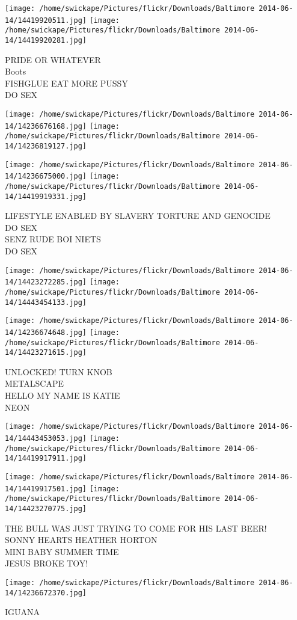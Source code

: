 \documentclass[10pt,letterpaper]{article}
\begin{document}
\texttt{[image: /home/swickape/Pictures/flickr/Downloads/Baltimore 2014-06-14/14419920511.jpg]}
\texttt{[image: /home/swickape/Pictures/flickr/Downloads/Baltimore 2014-06-14/14419920281.jpg]}

PRIDE OR WHATEVER\\
Boots\\
FISHGLUE EAT MORE PUSSY\\
DO SEX
\pagebreak

\texttt{[image: /home/swickape/Pictures/flickr/Downloads/Baltimore 2014-06-14/14236676168.jpg]}
\texttt{[image: /home/swickape/Pictures/flickr/Downloads/Baltimore 2014-06-14/14236819127.jpg]}

\texttt{[image: /home/swickape/Pictures/flickr/Downloads/Baltimore 2014-06-14/14236675000.jpg]}
\texttt{[image: /home/swickape/Pictures/flickr/Downloads/Baltimore 2014-06-14/14419919331.jpg]}

LIFESTYLE ENABLED BY SLAVERY TORTURE AND GENOCIDE\\
DO SEX\\
SENZ RUDE BOI NIETS\\
DO SEX
\pagebreak

\texttt{[image: /home/swickape/Pictures/flickr/Downloads/Baltimore 2014-06-14/14423272285.jpg]}
\texttt{[image: /home/swickape/Pictures/flickr/Downloads/Baltimore 2014-06-14/14443454133.jpg]}

\texttt{[image: /home/swickape/Pictures/flickr/Downloads/Baltimore 2014-06-14/14236674648.jpg]}
\texttt{[image: /home/swickape/Pictures/flickr/Downloads/Baltimore 2014-06-14/14423271615.jpg]}

UNLOCKED!  TURN KNOB\\
METALSCAPE\\
HELLO MY NAME IS KATIE\\
NEON
\pagebreak

\texttt{[image: /home/swickape/Pictures/flickr/Downloads/Baltimore 2014-06-14/14443453053.jpg]}
\texttt{[image: /home/swickape/Pictures/flickr/Downloads/Baltimore 2014-06-14/14419917911.jpg]}

\texttt{[image: /home/swickape/Pictures/flickr/Downloads/Baltimore 2014-06-14/14419917501.jpg]}
\texttt{[image: /home/swickape/Pictures/flickr/Downloads/Baltimore 2014-06-14/14423270775.jpg]}

THE BULL WAS JUST TRYING TO COME FOR HIS LAST BEER!\\
SONNY HEARTS HEATHER HORTON\\
MINI BABY SUMMER TIME\\
JESUS BROKE TOY!
\pagebreak

\texttt{[image: /home/swickape/Pictures/flickr/Downloads/Baltimore 2014-06-14/14236672370.jpg]}

IGUANA
\pagebreak
\end{document}
